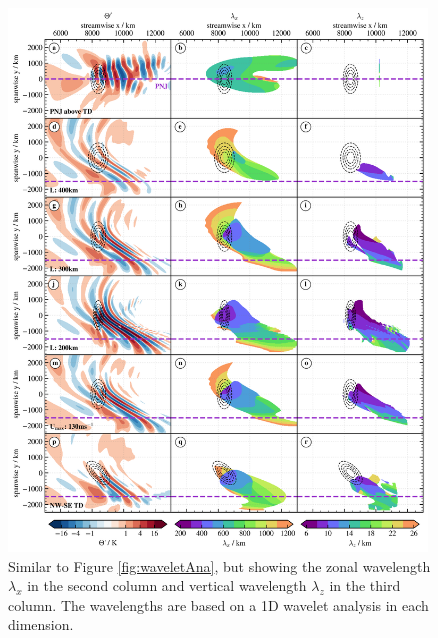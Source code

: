\begin{figure}[tbp]
    \centering
    \includegraphics[width=0.99\textwidth]{figures_3D/waveletAna_overview.png}
    \caption{Similar to Figure \ref{fig:waveletAna}, but showing the zonal wavelength $\lambda_x$ in the second column and vertical wavelength $\lambda_z$ in the third column. The wavelengths are based on a 1D wavelet analysis in each dimension.}
    \label{fig:waveletAna_xz}
\end{figure}
%
